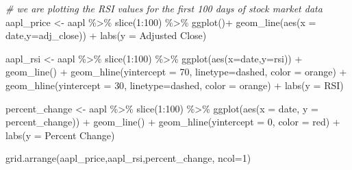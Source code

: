 \documentclass[
]{article}
\newenvironment{Shaded}{\begin{snugshade}}{\end{snugshade}}
\newcommand{\AttributeTok}[1]{\textcolor[rgb]{0.77,0.63,0.00}{#1}}
\newcommand{\CommentTok}[1]{\textcolor[rgb]{0.56,0.35,0.01}{\textit{#1}}}
\newcommand{\DecValTok}[1]{\textcolor[rgb]{0.00,0.00,0.81}{#1}}
\newcommand{\FunctionTok}[1]{\textcolor[rgb]{0.00,0.00,0.00}{#1}}
\newcommand{\NormalTok}[1]{#1}
\newcommand{\OtherTok}[1]{\textcolor[rgb]{0.56,0.35,0.01}{#1}}
\newcommand{\SpecialCharTok}[1]{\textcolor[rgb]{0.00,0.00,0.00}{#1}}
\newcommand{\StringTok}[1]{\textcolor[rgb]{0.31,0.60,0.02}{#1}}
\begin{document}
\begin{Shaded}
\begin{Highlighting}[]
\CommentTok{\# we are plotting the RSI values for the first 100 days of stock market data}
\NormalTok{aapl\_price }\OtherTok{\textless{}{-}}\NormalTok{ aapl }\SpecialCharTok{\%\textgreater{}\%}
  \FunctionTok{slice}\NormalTok{(}\DecValTok{1}\SpecialCharTok{:}\DecValTok{100}\NormalTok{) }\SpecialCharTok{\%\textgreater{}\%}
  \FunctionTok{ggplot}\NormalTok{()}\SpecialCharTok{+}
  \FunctionTok{geom\_line}\NormalTok{(}\FunctionTok{aes}\NormalTok{(}\AttributeTok{x =}\NormalTok{ date,}\AttributeTok{y=}\NormalTok{adj\_close)) }\SpecialCharTok{+} 
  \FunctionTok{labs}\NormalTok{(}\AttributeTok{y =} \StringTok{\textquotesingle{}Adjusted Close\textquotesingle{}}\NormalTok{)}

\NormalTok{aapl\_rsi }\OtherTok{\textless{}{-}}\NormalTok{ aapl }\SpecialCharTok{\%\textgreater{}\%}
  \FunctionTok{slice}\NormalTok{(}\DecValTok{1}\SpecialCharTok{:}\DecValTok{100}\NormalTok{) }\SpecialCharTok{\%\textgreater{}\%}
  \FunctionTok{ggplot}\NormalTok{(}\FunctionTok{aes}\NormalTok{(}\AttributeTok{x=}\NormalTok{date,}\AttributeTok{y=}\NormalTok{rsi)) }\SpecialCharTok{+}
  \FunctionTok{geom\_line}\NormalTok{() }\SpecialCharTok{+} 
  \FunctionTok{geom\_hline}\NormalTok{(}\AttributeTok{yintercept =} \DecValTok{70}\NormalTok{, }\AttributeTok{linetype=}\StringTok{\textquotesingle{}dashed\textquotesingle{}}\NormalTok{, }\AttributeTok{color =} \StringTok{\textquotesingle{}orange\textquotesingle{}}\NormalTok{) }\SpecialCharTok{+}
  \FunctionTok{geom\_hline}\NormalTok{(}\AttributeTok{yintercept =} \DecValTok{30}\NormalTok{, }\AttributeTok{linetype=}\StringTok{\textquotesingle{}dashed\textquotesingle{}}\NormalTok{, }\AttributeTok{color =} \StringTok{\textquotesingle{}orange\textquotesingle{}}\NormalTok{) }\SpecialCharTok{+}
  \FunctionTok{labs}\NormalTok{(}\AttributeTok{y =} \StringTok{\textquotesingle{}RSI\textquotesingle{}}\NormalTok{)}

\NormalTok{percent\_change }\OtherTok{\textless{}{-}}\NormalTok{ aapl }\SpecialCharTok{\%\textgreater{}\%}
  \FunctionTok{slice}\NormalTok{(}\DecValTok{1}\SpecialCharTok{:}\DecValTok{100}\NormalTok{) }\SpecialCharTok{\%\textgreater{}\%}
  \FunctionTok{ggplot}\NormalTok{(}\FunctionTok{aes}\NormalTok{(}\AttributeTok{x =}\NormalTok{ date, }\AttributeTok{y =}\NormalTok{ percent\_change)) }\SpecialCharTok{+}
  \FunctionTok{geom\_line}\NormalTok{() }\SpecialCharTok{+}
  \FunctionTok{geom\_hline}\NormalTok{(}\AttributeTok{yintercept =} \DecValTok{0}\NormalTok{, }\AttributeTok{color =} \StringTok{\textquotesingle{}red\textquotesingle{}}\NormalTok{) }\SpecialCharTok{+} 
  \FunctionTok{labs}\NormalTok{(}\AttributeTok{y =} \StringTok{\textquotesingle{}Percent Change\textquotesingle{}}\NormalTok{)}

\FunctionTok{grid.arrange}\NormalTok{(aapl\_price,aapl\_rsi,percent\_change, }\AttributeTok{ncol=}\DecValTok{1}\NormalTok{)}
\end{Highlighting}
\end{Shaded}
\end{document}
